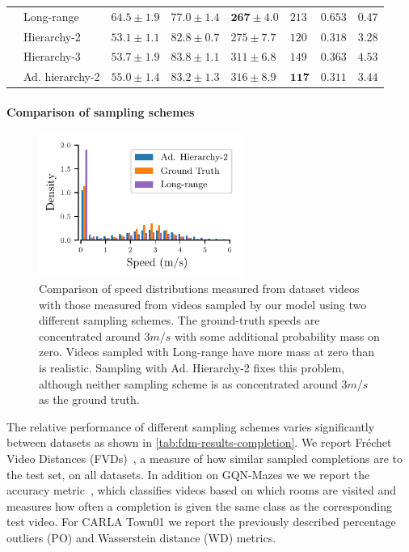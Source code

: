 \begin{table}
\begin{tabular}{llllllll}
    &  Long-range           & $64.5\pm1.9$            & $77.0 \pm 1.4$   & $\mathbf{267 \pm 4.0}$     & $213$          & $0.653$      & $\mathbf{0.47}$     \\
    &  Hierarchy-2          & $\mathbf{53.1 \pm 1.1}$ & $82.8 \pm 0.7$   & $275 \pm 7.7$        & $120$     & $0.318$  &  $3.28$      \\
    &  Hierarchy-3          & $53.7 \pm 1.9$          & $\mathbf{83.8 \pm 1.1}$   & $311 \pm 6.8$        & $149$      & $0.363$    &  $4.53$  \\
    &  Ad. hierarchy-2      & $55.0 \pm 1.4$          & $83.2 \pm 1.3$   & $316 \pm 8.9$    & $\mathbf{117}$          & $\mathbf{0.311}$     & $3.44$    \\
    \bottomrule
  \end{tabular}
\end{table}

\paragraph{Comparison of sampling schemes}
\begin{figure}
    \centering
    \includegraphics[width=0.6\textwidth]{figs/fdm/hist_new.pdf}
    \caption{Comparison of speed distributions measured from dataset videos with those measured from videos sampled by our model using two different sampling schemes. The ground-truth speeds are concentrated around $3m/s$ with some additional probability mass on zero. Videos sampled with Long-range have more mass at zero than is realistic. Sampling with Ad. Hierarchy-2 fixes this problem, although neither sampling scheme is as concentrated around $3m/s$ as the ground truth.}
    \label{fig:hist}
\end{figure}
The relative performance of different sampling schemes varies significantly between datasets as shown in \cref{tab:fdm-results-completion}. We report Fréchet Video Distances (FVDs)~\cite{unterthiner2018towards}, a measure of how similar sampled completions are to the test set, on all datasets. In addition on GQN-Mazes we we report the accuracy metric~\cite{saxena2021clockwork}, which classifies videos based on which rooms are visited and measures how often a completion is given the same class as the corresponding test video. For CARLA Town01 we report the previously described percentage outliers (PO) and Wasserstein distance (WD) metrics. 

